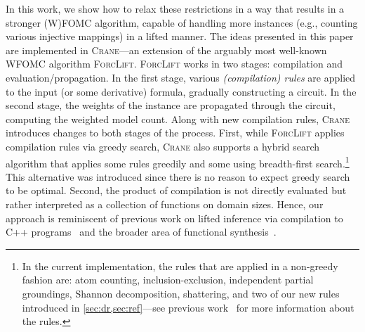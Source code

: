 \documentclass{article}
\theoremstyle{definition}
\begin{document}
In this work, we show how to relax these restrictions in a way that results in a
stronger (W)FOMC algorithm, capable of handling more instances (e.g., counting
various injective mappings) in a lifted manner. The ideas presented in this
paper are implemented in \textsc{Crane}---an extension of the arguably most
well-known WFOMC algorithm \textsc{ForcLift}. \textsc{ForcLift} works in two
stages: compilation and evaluation/propagation. In the first stage, various
\emph{(compilation) rules} are applied to the input (or some derivative)
formula, gradually constructing a circuit. In the second stage, the weights of
the instance are propagated through the circuit, computing the weighted model
count. Along with new compilation rules, \textsc{Crane} introduces changes to
both stages of the process. First, while \textsc{ForcLift} applies compilation
rules via greedy search, \textsc{Crane} also supports a hybrid search algorithm
that applies some rules greedily and some using breadth-first
search.\footnote{In the current implementation, the rules that are applied in a
  non-greedy fashion are: atom counting, inclusion-exclusion, independent
  partial groundings, Shannon decomposition, shattering, and two of our new
  rules introduced in \cref{sec:dr,sec:ref}---see previous
  work~\cite{DBLP:conf/ijcai/BroeckTMDR11} for more information about the
  rules.} This alternative was introduced since there is no reason to expect
greedy search to be optimal. Second, the product of compilation is not directly
evaluated but rather interpreted as a collection of functions on domain sizes.
Hence, our approach is reminiscent of previous work on lifted inference via
compilation to C++ programs~\cite{DBLP:conf/kr/KazemiP16} and the broader area
of functional
synthesis~\cite{DBLP:conf/cav/GoliaRM20,DBLP:conf/pldi/KuncakMPS10,sanathanan1963transfer}.

\end{document}
